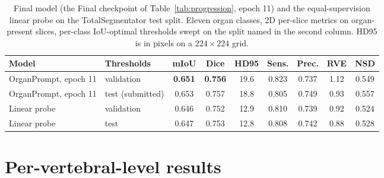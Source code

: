 \documentclass[10pt]{article}
\begin{document}
\begin{table}[H]
\centering
\caption{Final model (the Final checkpoint of Table~\ref{tab:progression}, epoch
11) and the equal-supervision linear probe on the TotalSegmentator test split.
Eleven organ classes, 2D per-slice metrics on organ-present slices, per-class
IoU-optimal thresholds swept on the split named in the second column. HD95 is in
pixels on a $224\times224$ grid.}
\label{tab:overall}
\begin{tabular}{llccccccc}
\toprule
Model & Thresholds & mIoU & Dice & HD95 & Sens. & Prec. & RVE & NSD \\
\midrule
OrganPrompt, epoch 11 & validation & \textbf{0.651} & \textbf{0.756} & 19.6 & 0.823 & 0.737 & 1.12 & 0.549 \\
OrganPrompt, epoch 11 & test (submitted) & 0.653 & 0.757 & 18.8 & 0.805 & 0.749 & 0.93 & 0.557 \\
Linear probe & validation & 0.646 & 0.752 & 12.9 & 0.810 & 0.739 & 0.92 & 0.524 \\
Linear probe & test & 0.647 & 0.753 & 12.8 & 0.808 & 0.742 & 0.88 & 0.528 \\
\bottomrule
\end{tabular}
\end{table}

\section{Per-vertebral-level results}
\label{app:perlevel}
\end{document}
